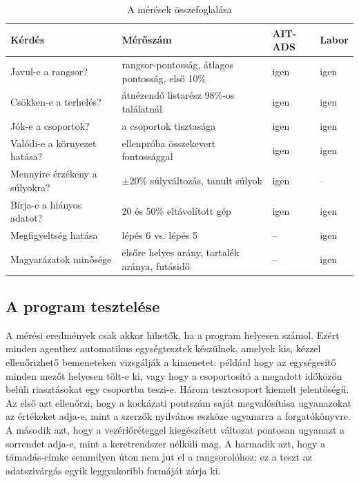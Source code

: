 \begin{table}[H]
    \centering
    \caption{A mérések összefoglalása}
    \label{tab:meresek}
    \small
    \begin{tabular}{|L{4.0cm}|L{5.6cm}|L{1.7cm}|L{1.7cm}|}
        \hline
        \textbf{Kérdés} & \textbf{Mérőszám} & \textbf{AIT-ADS} & \textbf{Labor} \\ \hline
        Javul-e a rangsor? & rangsor-pontosság, átlagos pontosság, első 10\% & igen & igen \\ \hline
        Csökken-e a terhelés? & átnézendő listarész 98\%-os találatnál & igen & igen \\ \hline
        Jók-e a csoportok? & a csoportok tisztasága & igen & igen \\ \hline
        Valódi-e a környezet hatása? & ellenpróba összekevert fontossággal & igen & igen \\ \hline
        Mennyire érzékeny a súlyokra? & $\pm 20\%$ súlyváltozás, tanult súlyok & igen & -- \\ \hline
        Bírja-e a hiányos adatot? & 20 és 50\% eltávolított gép & igen & igen \\ \hline
        Megfigyeltség hatása & lépés 6 vs. lépés 5 & -- & igen \\ \hline
        Magyarázatok minősége & elsőre helyes arány, tartalék aránya, futásidő & -- & igen \\ \hline
    \end{tabular}
\end{table}

\subsection{A program tesztelése}\label{sec:szoftverteszt}
A mérési eredmények csak akkor hihetők, ha a program helyesen számol. Ezért minden agenthez automatikus egységtesztek készülnek, amelyek kis, kézzel ellenőrizhető bemeneteken vizsgálják a kimenetet: például hogy az egységesítő minden mezőt helyesen tölt-e ki, vagy hogy a csoportosító a megadott időközön belüli riasztásokat egy csoportba teszi-e. Három tesztcsoport kiemelt jelentőségű. Az első azt ellenőrzi, hogy a kockázati pontszám saját megvalósítása ugyanazokat az értékeket adja-e, mint a szerzők nyilvános eszköze ugyanarra a forgatókönyvre. A második azt, hogy a vezérlőréteggel kiegészített változat pontosan ugyanazt a sorrendet adja-e, mint a keretrendszer nélküli mag. A harmadik azt, hogy a támadás-címke semmilyen úton nem jut el a rangsorolóhoz; ez a teszt az adatszivárgás egyik leggyakoribb formáját zárja ki.


